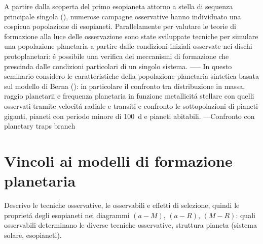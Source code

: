 \documentclass[twoside,11pt,fleqn]{memoir}%
\begin{document}
\begin{workout}
A partire dalla scoperta del primo esopianeta attorno a stella di sequenza principale singola (\cite{mayor1995jupiter}), numerose campagne osservative hanno individuato una cospicua popolazione di esopianeti. Parallelamente per valutare le teorie di formazione alla luce delle osservazione sono state sviluppate tecniche per simulare una popolazione planetaria a partire dalle condizioni iniziali osservate nei dischi protoplanetari: \'e possibile una verifica dei meccanismi di formazione che prescinda dalle condizioni particolari di un singolo sistema.
-----
In questo seminario considero le caratteristiche della popolazione planetaria sintetica basata sul modello di Berna (\cite{mordasini2018planetary}): in particolare il confronto tra distribuzione in massa, raggio planetarii e frequenza planetaria in funzione metallicit\'a stellare con quelli osservati tramite velocit\'a radiale e transiti e confronto le sottopolazioni di pianeti giganti, pianeti con periodo minore di \SI{100}{\day} e pianeti abitabili.
---Confronto con planetary traps branch
\end{workout}

{\let\clearpage\relax\let\cleardoublepage\relax
\part{Vincoli ai modelli di formazione planetaria}
}
\begin{errata}
Descrivo le tecniche osservative, le osservabili e effetti di selezione, quindi le propriet\'a degli esopianeti nei diagrammi $(a-M)$, $(a-R)$, $(M-R)$: quali osservabili determinano le diverse tecniche osservative, struttura pianeta (sistema solare, esopianeti).
\end{errata}
\end{document}
